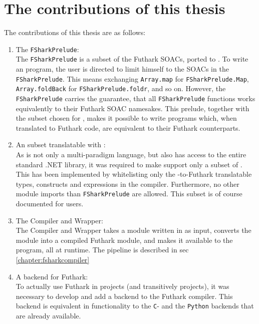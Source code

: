 \section*{The contributions of this thesis}
The contributions of this thesis are as follows:
\begin{enumerate}
\item The \texttt{FSharkPrelude}:\\
  The \texttt{FSharkPrelude} is a subset of the Futhark SOACs, ported to
  \fsharp{}. To write an \fshark{} program, the user is directed to limit
  himself to the SOACs in the \texttt{FSharkPrelude}. This means exchanging
  \texttt{Array.map} for \texttt{FSharkPrelude.Map}, \texttt{Array.foldBack} for
  \texttt{FSharkPrelude.foldr}, and so on.
  However, the \texttt{FSharkPrelude} carries the guarantee, that all
  \texttt{FSharkPrelude} functions works equivalently to their Futhark SOAC namesakes. 
  This prelude, together with the \fsharp{} subset chosen for \fshark{}, makes
  it possible to write \fsharp{} programs which, when translated to Futhark
  code, are equivalent to their Futhark counterparts.

\item An \fsharp{} subset translatable with \fshark{}:\\
  As \fsharp{} is not only a multi-paradigm language, but also has access to the
  entire standard .NET library, it was required to make \fshark{} support only a
  subset of \fsharp{}. This has been implemented by whitelisting only the
  \fsharp{}-to-Futhark translatable types, constructs and expressions in the \fshark{}
  compiler. Furthermore, no other module imports than \texttt{FSharkPrelude} are allowed. 
  This subset is of course documented for users.

\item The \fshark{} Compiler and Wrapper:\\
  The \fshark{} Compiler and Wrapper takes a module written in \fshark{} as
  input, converts the \fshark{} module into a compiled Futhark \csharp{} module,
  and makes it available to the \fsharp{} program, all at runtime.
  The pipeline is described in sec \ref{chapter:fsharkcompiler}

\item A \csharp{} backend for Futhark:\\
  To actually use Futhark in \csharp{} projects (and transitively \fsharp{}
  projects), it was necessary to develop and add a \csharp{} backend to
  the Futhark compiler. This backend is equivalent in functionality to
  the \texttt{C}- and the \texttt{Python} backends that are already available.

\end{enumerate}

